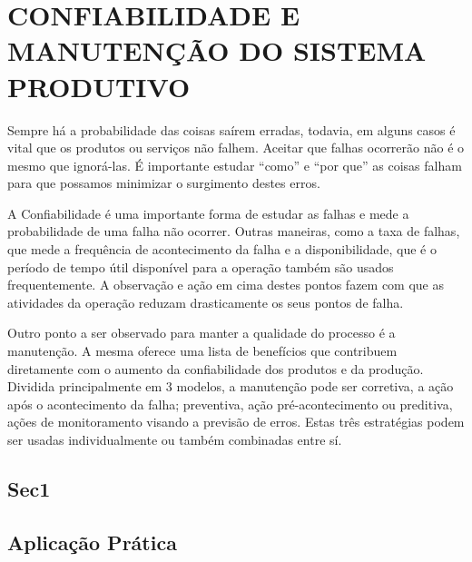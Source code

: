 \chapter{CONFIABILIDADE E MANUTENÇÃO DO SISTEMA PRODUTIVO}
\label{chap:confiabilidade_manutencao_do_sistema_produtivo}
Sempre há a probabilidade das coisas saírem erradas, todavia, em alguns casos é vital que os produtos ou serviços não falhem. Aceitar que falhas ocorrerão não é o mesmo que ignorá-las. É importante estudar ``como'' e ``por que'' as coisas falham para que possamos minimizar o surgimento destes erros.

A Confiabilidade é uma importante forma de estudar as falhas e mede a probabilidade de uma falha não ocorrer. Outras maneiras, como a taxa de falhas, que mede a frequência de acontecimento da falha e a disponibilidade, que é o período de tempo útil disponível para a operação também são usados frequentemente. A observação e ação em cima destes pontos fazem com que as atividades da operação reduzam drasticamente os seus pontos de falha.

Outro ponto a ser observado para manter a qualidade do processo é a manutenção. A mesma oferece uma lista de benefícios que contribuem diretamente com o aumento da confiabilidade dos produtos e da produção. Dividida principalmente em 3 modelos, a manutenção pode ser corretiva, a ação após o acontecimento da falha; preventiva, ação pré-acontecimento ou preditiva, ações de monitoramento visando a previsão de erros. Estas três estratégias podem ser usadas individualmente ou também combinadas entre sí.

\section{Sec1}
\label{sec:confiabilidade_manutencao_sec1}




\section{Aplicação Prática}
\label{sec:confiabilidade_manutencao_aplicacao}
